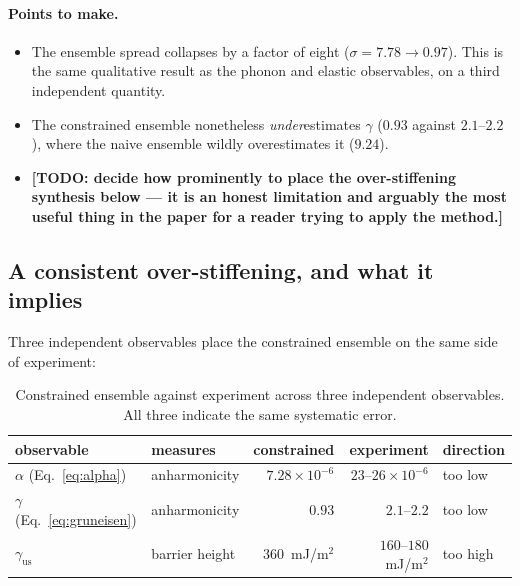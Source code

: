 \documentclass{article}
\newcommand{\TODO}[1]{{\color{blue}\textbf{[TODO: #1]}}}
\begin{document}
\paragraph{Points to make.}
\begin{itemize}
  \item The ensemble spread collapses by a factor of eight ($\sigma = 7.78 \to 0.97$). This is the same qualitative result as the phonon and elastic observables, on a third independent quantity.
  \item The constrained ensemble nonetheless \emph{under}estimates $\gamma$ ($0.93$ against $2.1$--$2.2$), where the naive ensemble wildly overestimates it ($9.24$).
  \item \TODO{decide how prominently to place the over-stiffening synthesis below --- it is an honest limitation and arguably the most useful thing in the paper for a reader trying to apply the method.}
\end{itemize}

\subsection{A consistent over-stiffening, and what it implies}
\label{sec:overstiffening}

Three independent observables place the constrained ensemble on the same side of
experiment:

\begin{table}[h]
\centering
\caption{Constrained ensemble against experiment across three independent
observables. All three indicate the same systematic error.}
\begin{tabular}{llrrl}
\toprule
observable & measures & constrained & experiment & direction \\
\midrule
$\alpha$ (Eq.~\ref{eq:alpha})       & anharmonicity  & $7.28\times10^{-6}$ & $23$--$26\times10^{-6}$ & too low  \\
$\gamma$ (Eq.~\ref{eq:gruneisen})   & anharmonicity  & $0.93$              & $2.1$--$2.2$            & too low  \\
$\gamma_{\mathrm{us}}$              & barrier height & $360$~mJ/m$^2$      & $160$--$180$~mJ/m$^2$   & too high \\
\bottomrule
\end{tabular}
\label{tab:overstiffening}
\end{table}
\end{document}
